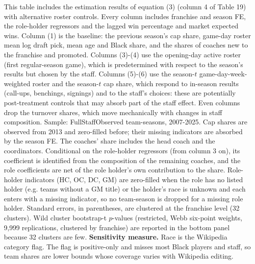 \begin{table}[!h]
{\begin{threeparttable}
\begin{tablenotes}[para]
\item This table includes the estimation results of equation (3) (column 4 of Table 19) with alternative roster controls. Every column includes franchise and season FE, the role-holder regressors and the lagged win percentage and market expected wins. Column (1) is the baseline: the previous season's cap share, game-day roster mean log draft pick, mean age and Black share, and the shares of coaches new to the franchise and promoted. Columns (3)-(4) use the opening-day active roster (first regular-season game), which is predetermined with respect to the season's results but chosen by the staff. Columns (5)-(6) use the season-$t$ game-day-week-weighted roster and the season-$t$ cap share, which respond to in-season results (call-ups, benchings, signings) and to the staff's choices: these are potentially post-treatment controls that may absorb part of the staff effect. Even columns drop the turnover shares, which move mechanically with changes in staff composition. Sample: FullStaffObserved team-seasons, 2007-2025. Cap shares are observed from 2013 and zero-filled before; their missing indicators are absorbed by the season FE. The coaches' share includes the head coach and the coordinators. Conditional on the role-holder regressors (from column 3 on), its coefficient is identified from the composition of the remaining coaches, and the role coefficients are net of the role holder's own contribution to the share. Role-holder indicators (HC, OC, DC, GM) are zero-filled when the role has no listed holder (e.g. teams without a GM title) or the holder's race is unknown and each enters with a missing indicator, so no team-season is dropped for a missing role holder. Standard errors, in parentheses, are clustered at the franchise level (32 clusters). Wild cluster bootstrap-t $p$-values (restricted, Webb six-point weights, 9,999 replications, clustered by franchise) are reported in the bottom panel because 32 clusters are few. \textbf{Sensitivity measure.} Race is the Wikipedia category flag. The flag is positive-only and misses most Black players and staff, so team shares are lower bounds whose coverage varies with Wikipedia editing.
\end{tablenotes}
\end{threeparttable}}
\end{table}
